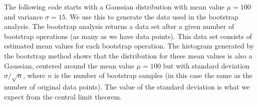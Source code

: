 \documentclass[%
oneside,                 %
final,                   %
10pt]{article}
\begin{document}
The following code starts with a Gaussian distribution with mean value $\mu =100$ and variance $\sigma=15$. We use this to generate the data used in the bootstrap analysis. The bootstrap analysis returns a data set after a given number of bootstrap operations (as many as we have data points). This data set consists of estimated mean values for each bootstrap operation. The histogram generated by the bootstrap method shows that the distribution for these mean values is also a Gaussian, centered around the mean value $\mu=100$ but with standard deviation $\sigma/\sqrt{n}$, where $n$ is the number of bootstrap samples (in this case the same as the number of original data points). The value of the standard deviation is what we expect from the central limit theorem. 
\end{document}
